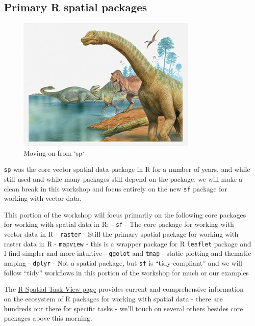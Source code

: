 \documentclass[
]{book}
\begin{document}
\hypertarget{primary-r-spatial-packages}{%
\subsection{Primary R spatial packages}\label{primary-r-spatial-packages}}

\begin{figure}
\includegraphics[width=0.75\linewidth]{images/Prehistoric} \caption{Moving on from `sp`}\label{fig:unnamed-chunk-18}
\end{figure}

\texttt{sp} was the core vector spatial data package in R for a number of years, and while still used and while many packages still depend on the package, we will make a clean break in this workshop and focus entirely on the new \texttt{sf} package for working with vector data.

This portion of the workshop will focus primarily on the following core packages for working with spatial data in R:
- \texttt{sf} - The core package for working with vector data in R
- \texttt{raster} - Still the primary spatial package for working with raster data in R
- \texttt{mapview} - this is a wrapper package for R \texttt{leaflet} package and I find simpler and more intuitive
- \texttt{ggolot} and \texttt{tmap} - static plotting and thematic maping
- \texttt{dplyr} - Not a spatial package, but \texttt{sf} is ``tidy-compliant'' and we will follow ``tidy'' workflows in this portion of the workshop for much or our examples

The \href{https://cran.r-project.org/web/views/Spatial.html}{R Spatial Task View page} provides current and comprehensive information on the ecosystem of R packages for working with spatial data - there are hundreds out there for specific tasks - we'll touch on several others besides core packages above this morning.
\end{document}
